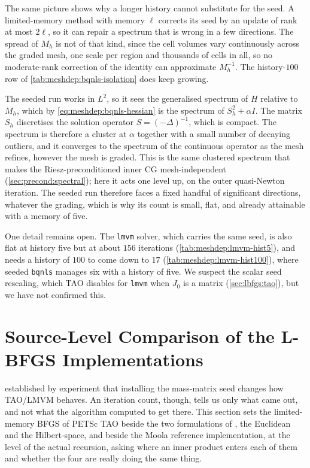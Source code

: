 \documentclass[a4paper,11pt]{article}
\theoremstyle{spacedplain} \newtheorem{theorem}[counter]{Theorem} \newtheorem{lemma}[counter]{Lemma} \newtheorem{prop}[counter]{Proposition} \newtheorem{cor}[counter]{Corollary}
\theoremstyle{spaceddefinition} \newtheorem{defn}[counter]{Definition} \newtheorem{example}[counter]{Example} \newtheorem{remark}[counter]{Remark}
\begin{document}
The same picture shows why a longer history cannot substitute for the seed. A limited-memory method with memory $\ell$ corrects its seed by an update of rank at most $2\ell$, so it can repair a spectrum that is wrong in a few directions. The spread of $M_h$ is not of that kind, since the cell volumes vary continuously across the graded mesh, one scale per region and thousands of cells in all, so no moderate-rank correction of the identity can approximate $M_h^{-1}$. The history-$100$ row of \cref{tab:meshdep:bqnls-isolation} does keep growing.

The seeded run works in $L^{2}$, so it sees the generalised spectrum of $H$ relative to $M_h$, which by \cref{eq:meshdep:bqnls-hessian} is the spectrum of $S_h^{2} + \alpha I$. The matrix $S_h$ discretises the solution operator $S = (-\Delta)^{-1}$, which is compact. The spectrum is therefore a cluster at $\alpha$ together with a small number of decaying outliers, and it converges to the spectrum of the continuous operator as the mesh refines, however the mesh is graded. This is the same clustered spectrum that makes the Riesz-preconditioned inner CG mesh-independent (\cref{sec:precond:spectral}); here it acts one level up, on the outer quasi-Newton iteration. The seeded run therefore faces a fixed handful of significant directions, whatever the grading, which is why its count is small, flat, and already attainable with a memory of five.

One detail remains open. The \texttt{lmvm} solver, which carries the same seed, is also flat at history five but at about $156$ iterations (\cref{tab:meshdep:lmvm-hist5}), and needs a history of $100$ to come down to $17$ (\cref{tab:meshdep:lmvm-hist100}), where seeded \texttt{bqnls} manages six with a history of five. We suspect the scalar seed rescaling, which TAO disables for \texttt{lmvm} when $J_0$ is a matrix (\cref{sec:lbfgs:tao}), but we have not confirmed this.

\section{Source-Level Comparison of the L-BFGS Implementations}
\label{sec:lbfgs-comparison}

 established by experiment that installing the mass-matrix seed changes how TAO/LMVM behaves. An iteration count, though, tells us only what came out, and not what the algorithm computed to get there. This section sets the limited-memory BFGS of PETSc TAO beside the two formulations of \citet[Sect.~1.5.4]{shfp2017}, the Euclidean and the Hilbert-space, and beside the Moola reference implementation, at the level of the actual recursion, asking where an inner product enters each of them and whether the four are really doing the same thing.
\end{document}
